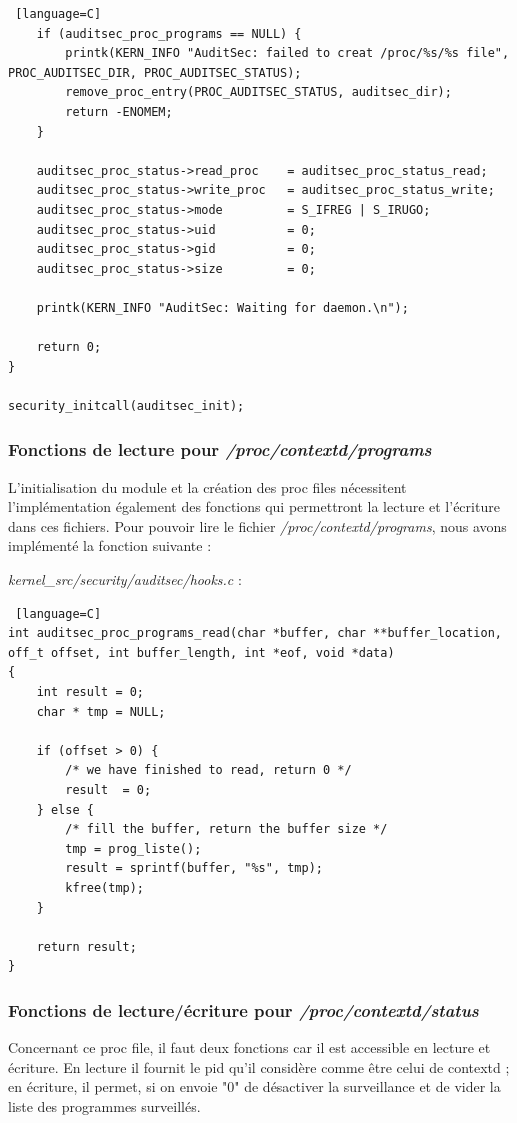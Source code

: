 \documentclass[pdftex,a4paper,titlepage,11pt]{article}
\begin{document}
\begin{lstlisting} [language=C]
	if (auditsec_proc_programs == NULL) {
		printk(KERN_INFO "AuditSec: failed to creat /proc/%s/%s file", PROC_AUDITSEC_DIR, PROC_AUDITSEC_STATUS);
		remove_proc_entry(PROC_AUDITSEC_STATUS, auditsec_dir);
		return -ENOMEM;
	}

	auditsec_proc_status->read_proc    = auditsec_proc_status_read;
	auditsec_proc_status->write_proc   = auditsec_proc_status_write;
	auditsec_proc_status->mode         = S_IFREG | S_IRUGO;
	auditsec_proc_status->uid          = 0;
	auditsec_proc_status->gid          = 0;
	auditsec_proc_status->size         = 0;

	printk(KERN_INFO "AuditSec: Waiting for daemon.\n");

	return 0;
}

security_initcall(auditsec_init);
\end{lstlisting}

\subsubsection{Fonctions de lecture pour \textit{/proc/contextd/programs}}

L'initialisation du module et la création des proc files nécessitent l'implémentation également des fonctions qui permettront la lecture et l'écriture dans ces fichiers. Pour pouvoir lire le fichier \textit{/proc/contextd/programs}, nous avons implémenté la fonction suivante :

\textit{{kernel\_src}/security/auditsec/hooks.c} :
\begin{lstlisting} [language=C]
int auditsec_proc_programs_read(char *buffer, char **buffer_location,  off_t offset, int buffer_length, int *eof, void *data)
{
	int result = 0;
	char * tmp = NULL;
	
	if (offset > 0) {
		/* we have finished to read, return 0 */
		result  = 0;
	} else {
		/* fill the buffer, return the buffer size */
		tmp = prog_liste();
		result = sprintf(buffer, "%s", tmp);
		kfree(tmp);
	}

	return result;
}
\end{lstlisting}

\subsubsection{Fonctions de lecture/écriture pour \textit{/proc/contextd/status}}

Concernant ce proc file, il faut deux fonctions car il est accessible en lecture et écriture. En lecture il fournit le pid qu'il considère comme être celui de contextd ; en écriture, il permet, si on envoie "0" de désactiver la surveillance et de vider la liste des programmes surveillés.
\end{document}
